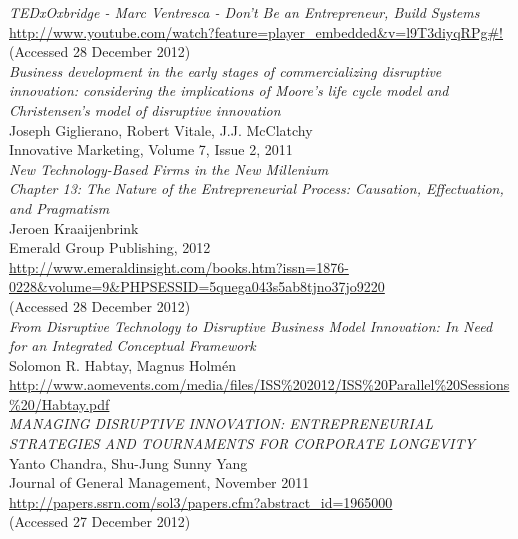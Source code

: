 \documentclass[a4paper,10pt]{article}
\begin{document}
\begin{thebibliography}{9}
 
  \emph{TEDxOxbridge - Marc Ventresca - Don't Be an Entrepreneur, Build Systems}\\
  \url{http://www.youtube.com/watch?feature=player_embedded&v=l9T3diyqRPg#!}\\
  (Accessed 28 December 2012)\\
 
  \emph{Business development in the early stages of commercializing
      disruptive innovation: considering the implications of Moore’s life
      cycle model and Christensen’s model of disruptive innovation}\\
  Joseph Giglierano, Robert Vitale, J.J. McClatchy\\
  Innovative Marketing, Volume 7, Issue 2, 2011\\
  

  \emph{New Technology-Based Firms in the New Millenium\\
	Chapter 13:  The Nature of the Entrepreneurial Process: Causation, Effectuation, and Pragmatism}\\
    Jeroen Kraaijenbrink\\
    Emerald Group Publishing, 2012\\
  \url{http://www.emeraldinsight.com/books.htm?issn=1876-0228&volume=9&PHPSESSID=5quega043s5ab8tjno37jo9220}\\
  (Accessed 28 December 2012)\\

  
  \emph{From Disruptive Technology to Disruptive Business Model Innovation: In Need for an Integrated Conceptual Framework}\\
  Solomon R. Habtay, Magnus Holmén\\
  \url{http://www.aomevents.com/media/files/ISS\%202012/ISS\%20Parallel\%20Sessions\%20/Habtay.pdf}\\
  
  \emph{MANAGING DISRUPTIVE INNOVATION: ENTREPRENEURIAL STRATEGIES AND TOURNAMENTS FOR CORPORATE LONGEVITY}\\
  Yanto Chandra, Shu-Jung Sunny Yang\\
   Journal of General Management, November 2011\\
  \url{http://papers.ssrn.com/sol3/papers.cfm?abstract_id=1965000}\\
  (Accessed 27 December 2012)\\


\end{thebibliography}
\end{document}
